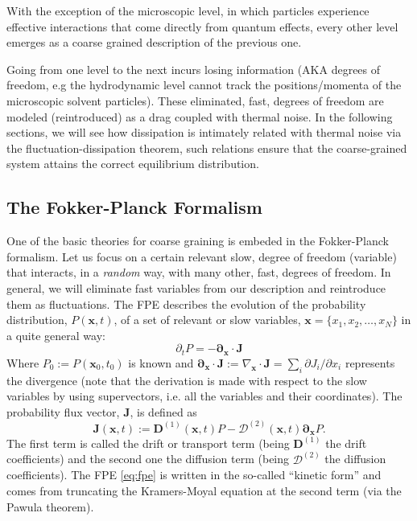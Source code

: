 \documentclass[ twoside,openright,titlepage,numbers=noenddot,%
headinclude,footinclude,cleardoublepage=empty,abstract=on,
BCOR=5mm,paper=a4,fontsize=11pt, dvipsnames
]{scrreprt}
\renewcommand{\vec}[1]{\bm{#1}}
\newcommand{\tens}[1]{\bm{\mathcal{#1}}}
\begin{document}
With the exception of the microscopic level, in which particles experience effective interactions that come directly from quantum effects, every other level emerges as a coarse grained description of the previous one. 

Going from one level to the next incurs losing information (AKA degrees of freedom, e.g the hydrodynamic level cannot track the positions/momenta of the microscopic solvent particles). These eliminated, fast, degrees of freedom are modeled (reintroduced) as a drag coupled with thermal noise. In the following sections, we will see how dissipation is intimately related with thermal noise via the fluctuation-dissipation theorem, such relations ensure that the coarse-grained system attains the correct equilibrium distribution.


\subsection{The Fokker-Planck Formalism}\label{sec:fpe}
One of the basic theories for coarse graining is embeded in the Fokker-Planck formalism. Let us focus on a certain relevant slow, degree of freedom (variable) that interacts, in a \emph{random} way, with many other, fast, degrees of freedom. In general, we will eliminate fast variables from our description and reintroduce them as fluctuations. The \gls{FPE} describes the evolution of the probability distribution, $P(\vec{x},t)$, of a set of relevant or slow variables, $\vec{x} = \{x_1, x_2,\dots, x_N\}$ in a quite general way:
  \begin{equation}
    \label{eq:fpe}
    \partial_t P = -\vec{\partial}_{\vec{x}}\cdot \vec{J}
  \end{equation}
Where $P_0 := P(\vec{x}_0, t_0)$ is known and $\vec{\partial}_{\vec{x}}\cdot \vec{J} := \nabla_{\vec{x}}\cdot\vec{J} = \sum_i\partial J_i/\partial x_i  $ represents the divergence (note that the derivation is made with respect to the slow variables by using supervectors, i.e. all the variables and their coordinates\cite{Dhont1996}).
The probability flux vector, $\vec{J}$, is defined as
\begin{equation}
  \label{eq:fpeflux}
  \vec{J}(\vec{x}, t) := \vec{D}^{(1)}(\vec{x},t)P - \tens{D}^{(2)}(\vec{x}, t) \vec{\partial}_{\vec{x}} P.
\end{equation}
The first term is called the drift or transport term (being $\vec{D}^{(1)}$ the drift coefficients) and the second one the diffusion term (being $\tens{D}^{(2)}$ the diffusion coefficients). The \gls{FPE} \eqref{eq:fpe} is written in the so-called ``kinetic form'' and comes from truncating the Kramers-Moyal equation at the second term (via the Pawula theorem)\cite{Risken2012}.
\end{document}
